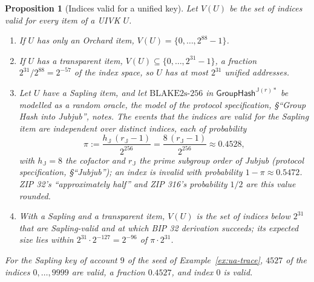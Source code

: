 \documentclass[11pt,a4paper]{article}
\newtheorem{proposition}[theorem]{Proposition}
\theoremstyle{definition}
\begin{document}
\begin{proposition}[Indices valid for a unified key]%
\label{prop:addr-valid-indices}
Let $V(U)$ be the set of indices valid for every item of a UIVK $U$.
\begin{enumerate}[label=(\alph*)]
\item If $U$ has only an Orchard item, $V(U) = \{0, \dots, 2^{88} - 1\}$.
\item If $U$ has a transparent item, $V(U) \subseteq
  \{0, \dots, 2^{31} - 1\}$, a fraction $2^{31}/2^{88} = 2^{-57}$ of the
  index space, so $U$ has at most $2^{31}$ unified addresses.
\item Let $U$ have a Sapling item, and let $\mathrm{BLAKE2s\text{-}256}$ in
  $\mathsf{GroupHash}^{\mathbb{J}(r)*}$ be modelled as a random oracle, the
  model of the protocol specification, \S``Group Hash into Jubjub'', notes.
  The events that the indices are valid for the Sapling item are
  independent over distinct indices, each of probability
  \[
    \pi := \frac{h_{\mathbb{J}}\,(r_{\mathbb{J}} - 1)}{2^{256}}
      = \frac{8\,(r_{\mathbb{J}} - 1)}{2^{256}} \approx 0.4528,
  \]
  with $h_{\mathbb{J}} = 8$ the cofactor and $r_{\mathbb{J}}$ the prime
  subgroup order of Jubjub (protocol specification, \S``Jubjub''); an index
  is invalid with probability $1 - \pi \approx 0.5472$. ZIP 32's
  ``approximately half'' and ZIP 316's probability $1/2$ are this value
  rounded.
\item With a Sapling and a transparent item, $V(U)$ is the set of indices
  below $2^{31}$ that are Sapling-valid and at which BIP 32 derivation
  succeeds; its expected size lies within $2^{31} \cdot 2^{-127} = 2^{-96}$
  of $\pi \cdot 2^{31}$.
\end{enumerate}
For the Sapling key of account $9$ of the seed of
Example~\ref{ex:ua-trace}, $4527$ of the indices $0, \dots, 9999$ are
valid, a fraction $0.4527$, and index $0$ is valid.
\end{proposition}
\end{document}
